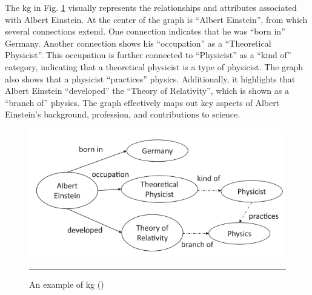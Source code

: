 The \gls{kg} in Fig. \ref{fig:kg-example-albert-einstein} visually represents the relationships and attributes associated with Albert Einstein.
At the center of the graph is ``Albert Einstein'', from which several connections extend.
One connection indicates that he was ``born in'' Germany.
Another connection shows his ``occupation'' as a ``Theoretical Physicist''.
This occupation is further connected to ``Physicist'' as a ``kind of'' category, indicating that a theoretical physicist is a type of physicist.
The graph also shows that a physicist ``practices'' physics.
Additionally, it highlights that Albert Einstein ``developed'' the ``Theory of Relativity'', which is shown as a ``branch of'' physics.
The graph effectively maps out key aspects of Albert Einstein's background, profession, and contributions to science.

\begin{figure}[htbp]
    \centering
 \includegraphics[width=.7\textwidth]{03_Figures/literature-review/kg-example-albert-einstein.png}
     \rule{35em}{0.5pt}
    \caption{An example of \acrlong{kg} (\cite{Chaudhri2022})} 
 \label{fig:kg-example-albert-einstein}
\end{figure}

